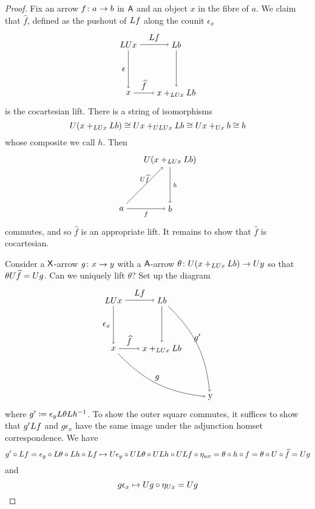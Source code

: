 \documentclass{amsart}
\begin{document}
\begin{proof}
  Fix an arrow $ f \colon a \to b $ in $ \mathsf{A} $
  and an object $ x $ in the fibre of $ a $. We
  claim that $ \hat{f} $, defined as the pushout
  of $ L f $
  along the counit $ \epsilon_x $
  \[
    \begin{tikzpicture}
      \node (ul) at (0,2) {$ \L \U x $};
      \node (ll) at (0,0) {$ x $};
      \node (ur) at (2,2) {$ \L b $};
      \node (lr) at (2,0) {$ x +_{\L\U x} \L b$};
      \draw [->] (ul) to node [left] {$ \epsilon $} (ll);
      \draw [->] (ul) to node [above] {$ \L f $} (ur);
      \draw [->] (ll) to node [above] {$ \hat{f} $} (lr);
      \draw [->] (ur) to (lr);
    \end{tikzpicture}
  \]
  is the cocartesian lift. There is a string of
  isomorphisms
  \[
    U ( x +_{LU x} L b ) \cong
    U x +_{ULU x} L b \cong
    U x +_{U x} b \cong
    b
  \]
  whose composite we call $ h $.  Then
  \[
    \begin{tikzpicture}
      \node (a) at (0,0) {$ a $};
      \node (b) at (2,0) {$ b $};
      \node (c) at (2,2) {$ \U ( x+_{\L\U x} \L b ) $};
      \path[->,font=\scriptsize]
      (a) edge node[below]{$ f $} (b)
      (a) edge node[above]{$ \U\hat{f} $} (c)
      (c) edge node[right]{$ h $} (b);
    \end{tikzpicture}
  \]
  commutes, and so $ \hat{f} $ is an appropriate
  lift. It remains to show that $ \hat{f} $ is
  cocartesian.

  Consider a $ \mathsf{X} $-arrow $ g \colon x \to y $
  with a $ \mathsf{A} $-arrow
  $ \theta \colon U( x +_{LU x} L b ) \to U y $ so
  that $ \theta U \widehat{f} = U g $.  Can we
  uniquely lift $ \theta $? Set up the diagram
  \[
    \begin{tikzpicture}
      \node (ul) at (0,2) {$ \L\U x $};
      \node (ll) at (0,0) {$ x $};
      \node (ur) at (2,2) {$ \L b $};
      \node (lr) at (2,0) {$ x +_{\L\U x} \L b$};
      \node (comp) at (4,-2) {y};
      \draw [->] (ul) to node [left] {$ \epsilon_x $} (ll);
      \draw [->] (ul) to node [above] {$ \L f $} (ur);
      \draw [->] (ll) to node [above] {$ \hat{f} $} (lr);
      \draw [->] (ur) to (lr);
      \draw [->] (ll) to [bend right=20] node [above] {$ g $} (comp);
      \draw [->] (ur) to [bend left=20] node [above] {$ g' $} (comp);
    \end{tikzpicture}
  \] 
  where $ g' \coloneqq \epsilon_y L\theta L h^{-1} $.
  To show the outer square commutes, it suffices
  to show that $ g' L f $ and $ g \epsilon_x $
  have the same image under the adjunction homset
  correspondence.  We have
  \[
    g' \circ L f =
    \epsilon_y \circ L\theta \circ L h \circ L f
    \mapsto
    U\epsilon_y \circ UL\theta \circ UL h
      \circ UL f \circ\eta_{ux}
    = \theta \circ h \circ f   
    = \theta \circ U \circ \widehat{f} 
    = U g
  \]
  and 
  \[
    g \epsilon_x
    \mapsto
    U g \circ \eta_{U x}
    = U g
  \]
\end{proof}
\end{document}

